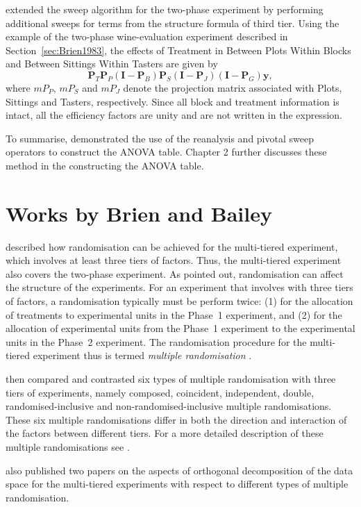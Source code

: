 \documentclass[11pt,a4paper]{article}
\newcommand{\mP}{\mathbf{P}}
\newcommand{\I}{\mathbf{I}}
\begin{document}
\cite{Brien1999} extended the sweep algorithm for the two-phase experiment by performing additional sweeps for terms from the structure formula of third tier. Using the example of the two-phase wine-evaluation experiment described in Section~\ref{sec:Brien1983}, the effects of Treatment in Between Plots Within Blocks and Between Sittings Within Tasters are given by 
\[\mP_T \mP_P (\I - \mP_B) \mP_S (\I - \mP_J) (\I - \mP_G)\bm{y}, \]
where $mP_P$, $mP_S$ and $mP_J$ denote the projection matrix associated with Plots, Sittings and Tasters, respectively. Since all block and treatment information is intact, all the efficiency factors are unity and are not written in the expression. 

To summarise, \cite{Brien1999} demonstrated the use of the reanalysis and pivotal sweep operators to construct the ANOVA table. Chapter 2 further discusses these method in the constructing the ANOVA table.

\section{Works by Brien and Bailey} 
\cite{Brien2006b} described how randomisation can be achieved for the multi-tiered experiment, which involves at least three tiers of factors. Thus, the multi-tiered experiment also covers the two-phase experiment. As \cite{Brien1983} pointed out, randomisation can affect the structure of the experiments. For an experiment that involves with three tiers of factors, a randomisation typically must be perform twice: (1) for the allocation of treatments to experimental units in the Phase~1 experiment, and (2) for the allocation of experimental units from the Phase~1 experiment to the experimental units in the Phase~2 experiment. The randomisation procedure for the multi-tiered experiment thus is termed \emph{multiple randomisation} \citep{Brien2006b}.  

\cite{Brien2006b} then compared and contrasted six types of multiple randomisation with three tiers of experiments, namely composed, coincident, independent, double, randomised-inclusive and non-randomised-inclusive multiple randomisations. These six multiple randomisations differ in both the direction and interaction of the factors between different tiers. For a more detailed description of these multiple randomisations see \cite{Brien2006b}.

\cite{Brien2009, Brien2010} also published two papers on the aspects of orthogonal decomposition of the data space for the multi-tiered experiments with respect to different types of multiple randomisation.
\end{document}
